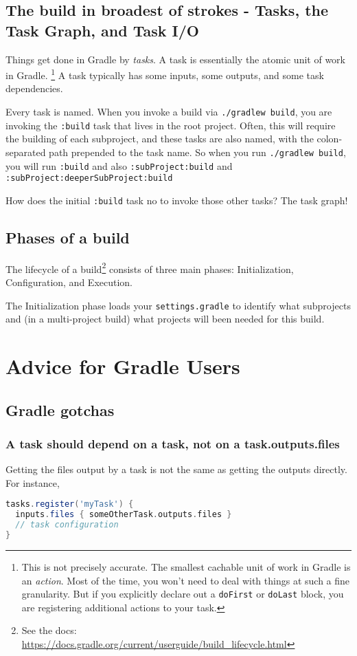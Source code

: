 \documentclass[]{article}
\theoremstyle{definition}
\begin{document}
\subsection{The build in broadest of strokes - Tasks, the Task Graph, and Task I/O}

Things get done in Gradle by \emph{tasks}.
A task is essentially the atomic unit of work in Gradle.%
\footnote{This is not precisely accurate.
  The smallest cachable unit of work in Gradle is an \emph{action}.
  Most of the time, you won't need to deal with things at such a fine granularity.
  But if you explicitly declare out a \texttt{doFirst} or \texttt{doLast} block, you are registering additional actions to your task.
}
A task typically has some inputs, some outputs, and some task dependencies.

Every task is named.
When you invoke a build via \texttt{./gradlew build}, you are invoking the \texttt{:build} task that lives in the root project.
Often, this will require the building of each subproject, and these tasks are also named, with the colon-separated path prepended to the task name.
So when you run \texttt{./gradlew build}, you will run \texttt{:build} and also \texttt{:subProject:build} and \texttt{:subProject:deeperSubProject:build}

How does the initial \texttt{:build} task no to invoke those other tasks?
The task graph!

\subsection{Phases of a build}
The lifecycle of a build\footnote{See the docs: \url{https://docs.gradle.org/current/userguide/build_lifecycle.html}} consists of three main phases: Initialization, Configuration, and Execution.

The Initialization phase loads your \texttt{settings.gradle} to identify what subprojects and (in a multi-project build) what projects will been needed for this build.



\section{Advice for Gradle Users}

\subsection{Gradle gotchas}

\subsubsection{A task should depend on a task, not on a task.outputs.files}
Getting the files output by a task is not the same as getting the outputs directly.  For instance,
\begin{lstlisting}[language=Groovy]
tasks.register('myTask') {
  inputs.files { someOtherTask.outputs.files }
  // task configuration
}
\end{lstlisting}
\end{document}
